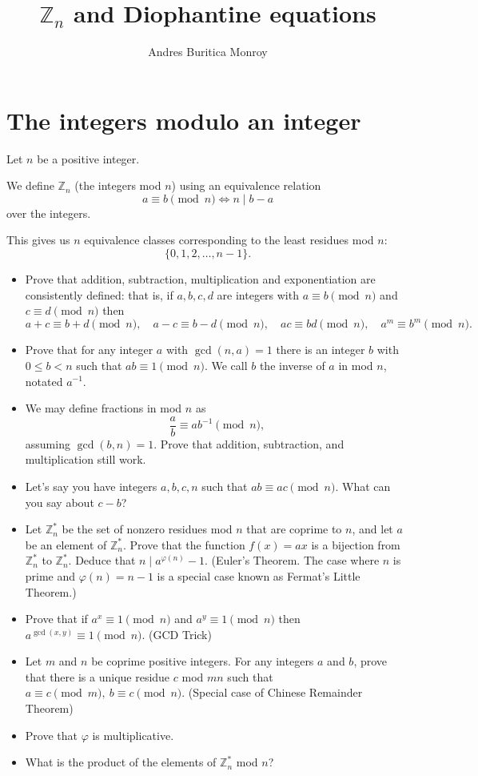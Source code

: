 \documentclass{article}
\title{$\mathbb Z_n$ and Diophantine equations}
\author{Andres Buritica Monroy}
\date{}
\begin{document}
\maketitle
\section{The integers modulo an integer}
  Let $n$ be a positive integer.

  We define $\mathbb Z_n$ (the integers mod $n$) using an equivalence relation
  \[a\equiv b\pmod n\iff n\mid b-a\]
  over the integers.

  This gives us $n$ equivalence classes corresponding to the least residues mod
  $n$: \[\{0,1,2,\ldots,n-1\}.\]
  \begin{itemize}
    \item Prove that addition, subtraction, multiplication and exponentiation
      are consistently defined: that
      is, if $a,b,c,d$ are integers with $a\equiv b\pmod n$ and $c\equiv d\pmod
      n$ then \[a+c\equiv b+d\pmod n,\quad a-c\equiv b-d\pmod n,\quad ac\equiv
        bd\pmod n,\quad a^m\equiv b^m\pmod n.\]
    \item Prove that for any integer $a$ with $\gcd(n,a)=1$ there is an integer $b$
      with $0\le b<n$ such that $ab\equiv 1\pmod n$. We call $b$ the inverse of
      $a$ in mod $n$, notated $a^{-1}$.
    \item We may define fractions in mod $n$ as \[\frac ab\equiv ab^{-1}\pmod n,\]
      assuming $\gcd(b,n)=1$. Prove that addition, subtraction, and
      multiplication still work.
    \item Let's say you have integers $a,b,c,n$ such that $ab\equiv ac\pmod n$.
      What can you say about $c-b$?
    \item Let $\mathbb Z_n^*$ be the set of nonzero residues mod $n$ that are
      coprime to $n$, and let $a$ be an
      element of $\mathbb Z_n^*$. Prove that the function $f(x)=ax$ is a
      bijection from $\mathbb Z_n^*$ to $\mathbb Z_n^*$. Deduce that $n\mid
      a^{\varphi(n)}-1$. (Euler's Theorem. The case where $n$ is prime and
      $\varphi(n)=n-1$ is a special case known as Fermat's Little Theorem.)
    \item Prove that if $a^x\equiv 1\pmod n$ and $a^y\equiv 1\pmod n$ then
      $a^{\gcd(x,y)}\equiv 1\pmod n$. (GCD Trick)
    \item Let $m$ and $n$ be coprime positive integers. For any integers $a$ and
      $b$, prove that there is a unique residue $c$ mod $mn$ such that $a\equiv
      c\pmod m,\ b\equiv c\pmod n$. (Special case of Chinese Remainder Theorem)
    \item Prove that $\varphi$ is multiplicative.
    \item What is the product of the elements of $\mathbb Z_n^*$ mod $n$?
  \end{itemize}
  \newpage
\end{document}
